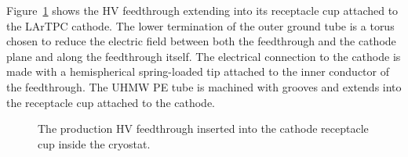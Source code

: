 
Figure~\ref{fig:hv-FT-cryostat} shows the HV feedthrough extending into its receptacle cup attached to the LArTPC cathode.  The lower termination of the outer ground tube is a torus chosen to reduce the electric field between both the feedthrough and the cathode plane and along the feedthrough itself.  The electrical connection to the cathode is made with a hemispherical spring-loaded tip attached to the inner conductor of the feedthrough.  The UHMW PE tube is machined with grooves and extends into the receptacle cup attached to the cathode.

\begin{figure}
\caption{The production HV feedthrough inserted into the cathode receptacle cup inside the cryostat.}
\label{fig:hv-FT-cryostat}
\end{figure}

